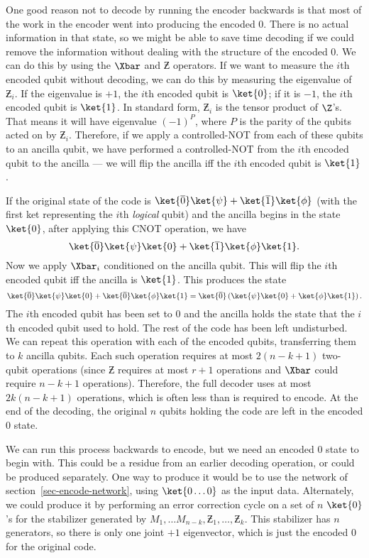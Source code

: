 One good reason not to decode by running the encoder backwards is that
most of the work in the encoder went into producing the encoded $0$.
There is no actual information in that state, so we might be able to save
time decoding if we could remove the information without dealing with the
structure of the encoded $0$.  We can do this by using the $\Xbar$ and
$\Zbar$ operators.  If we want to measure the $i$th encoded qubit
without decoding, we can do this by measuring the eigenvalue of
$\Zbar_i$.  If the eigenvalue is $+1$, the $i$th encoded qubit is $\ket{0}$;
if it is $-1$, the $i$th encoded qubit is $\ket{1}$.  In standard form,
$\Zbar_i$ is the tensor product of $\Z$'s.  That means it will have
eigenvalue $(-1)^P$, where $P$ is the parity of the qubits acted on by
$\Zbar_i$.  Therefore, if we apply a controlled-NOT from each of these
qubits to an ancilla qubit, we have performed a controlled-NOT from the
$i$th encoded qubit to the ancilla --- we will flip the ancilla iff the $i$th
encoded qubit is $\ket{1}$.

If the original state of the code is $\ket{\overline{0}} \ket{\psi} +
\ket{\overline{1}} \ket{\phi}$ (with the first ket representing the $i$th
	{\em logical} qubit) and the ancilla begins in the state $\ket{0}$, after
applying this CNOT operation, we have
\begin{equation}
	\ket{\overline{0}} \ket{\psi} \ket{0} + \ket{\overline{1}} \ket{\phi}
	\ket{1}.
\end{equation}
Now we apply $\Xbar_i$ conditioned on the ancilla qubit.  This will flip the
$i$th encoded qubit iff the ancilla is $\ket{1}$.  This produces the state
\begin{equation}
	\ket{\overline{0}} \ket{\psi} \ket{0} + \ket{\overline{0}} \ket{\phi}
	\ket{1} = \ket{\overline{0}} \left(\ket{\psi} \ket{0} + \ket{\phi} \ket{1}
	\right).
\end{equation}
The $i$th encoded qubit has been set to $0$ and the ancilla holds the state
that the $i$th encoded qubit used to hold.  The rest of the code has been
left undisturbed.  We can repeat this operation with each of the encoded
qubits, transferring them to $k$ ancilla qubits.  Each such operation requires
at most $2(n-k+1)$ two-qubit operations (since $\Zbar$ requires at most $r + 1$
operations and $\Xbar$ could require $n-k+1$ operations).  Therefore, the
full decoder uses at most $2k(n-k+1)$ operations, which is often less than
is required to encode.  At the end of the decoding, the original $n$ qubits
holding the code are left in the encoded $0$ state.

We can run this process backwards to encode, but we need an encoded $0$
state to begin with.  This could be a residue from an earlier decoding
operation, or could be produced separately.  One way to produce it would
be to use the network of section~\ref{sec-encode-network}, using
$\ket{0\ldots 0}$ as the input data.  Alternately, we could produce it by
performing an error correction cycle on a set of $n$ $\ket{0}$'s for the
stabilizer generated by $M_1, \ldots M_{n-k}, \Zbar_1, \ldots, \Zbar_k$.
This stabilizer has $n$ generators, so there is only one joint $+1$
eigenvector, which is just the encoded $0$ for the original code.